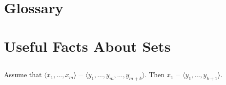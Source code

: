 \documentclass{report}
\begin{document}

\tableofcontents

\begingroup
\renewcommand\thechapter{G}

\chapter{Glossary}%
\label{chap:glossary}

\endgroup

\setcounter{chapter}{0}
\addtocounter{chapter}{-1}
\chapter{Useful Facts About Sets}%
\label{chap:useful-facts-about-sets}

\section{}%
\label{sec:lemma-0a}

Assume that $\langle x_1, \ldots, x_m \rangle =
  \langle y_1, \ldots, y_m, \ldots, y_{m+k} \rangle$.
Then $x_1 = \langle y_1, \ldots, y_{k+1} \rangle$.
\end{document}
